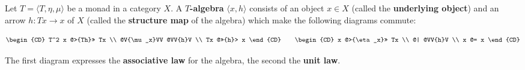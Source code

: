 Let $T = \langle T, \eta, \mu \rangle$ be a monad in a category $X$.
A \textbf{$T$-algebra} $\langle x, h \rangle$ consists of
an object $x \in X$ (called the \textbf{underlying object}) and
an arrow $h: Tx \to x$ of $X$ (called the \textbf{structure map} of the algebra)
which make the following diagrams commute:

\[
\begin{CD}
T^2 x @>{Th}>> Tx \\
@V{\mu_x}VV @VV{h}V \\
Tx @>>{h}> x
\end{CD}
\qquad
\begin{CD}
x @>{\eta_x}>> Tx \\
@| @VV{h}V \\
x @= x
\end{CD}
\]

The first diagram expresses the \textbf{associative law} for the algebra,
the second the \textbf{unit law}.
